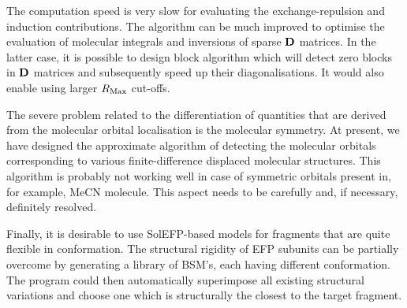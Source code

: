 \documentclass[a4paper,titlepage,twoside,fleqn,12pt]{book}
\begin{document}
\begin{refsection}
The computation speed is very slow for evaluating the exchange\hyp{}repulsion and induction
contributions. The algorithm can be much improved to optimise the
evaluation of molecular integrals and inversions of sparse $\bf D$ matrices.
In the latter case, it is possible to design block algorithm which
will detect zero blocks in $\bf D$ matrices and subsequently speed up their
diagonalisations. It would also enable using larger $R_{\rm Max}$ cut\hyp{}offs.

The severe problem related to the differentiation of quantities that are
derived from the molecular orbital localisation is the molecular symmetry.
At present, we have designed the approximate algorithm of detecting the
molecular orbitals corresponding to various finite\hyp{}difference displaced
molecular structures. This algorithm is probably not working well in case of
symmetric orbitals present in, for example, MeCN molecule. This aspect needs 
to be carefully and, if necessary, definitely resolved.

Finally, it is desirable to use SolEFP\hyp{}based models for fragments
that are quite flexible in conformation. The structural rigidity of EFP
subunits can be partially overcome by generating a library of BSM's,
each having different conformation. The program could then automatically superimpose
all existing structural variations and choose one which is structurally the closest
to the target fragment.



\printbibliography[heading=subbibintoc,title={References}]
\end{refsection}

\end{document}
